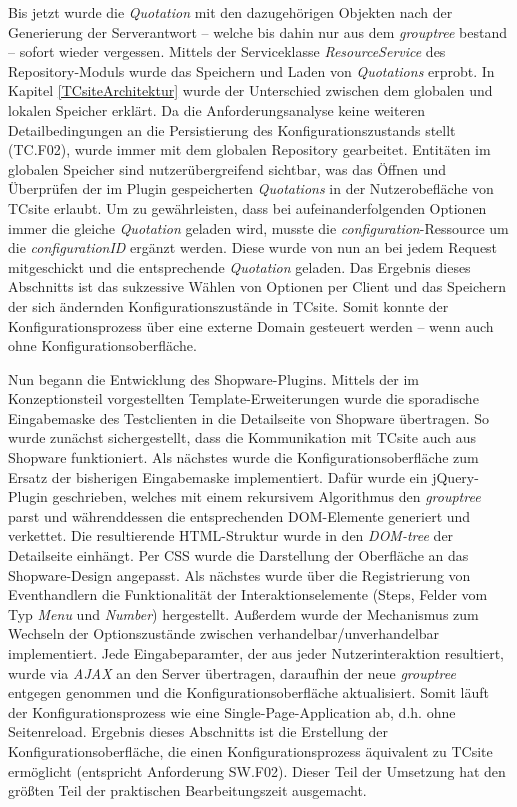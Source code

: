 \documentclass[11pt, a4paper, titlepage, listof=totoc, bibliography=totoc, index=totoc, twoside, openright, headings=normal, draft]{scrreprt}
\begin{document}
Bis jetzt wurde die \emph{Quotation} mit den dazugehörigen Objekten nach der Generierung der Serverantwort -- welche bis dahin nur aus dem \emph{grouptree} bestand -- sofort wieder vergessen. Mittels der Serviceklasse \emph{ResourceService} des Repository-Moduls wurde das Speichern und Laden von \emph{Quotations} erprobt. In Kapitel \ref{TCsiteArchitektur} wurde der Unterschied zwischen dem globalen und lokalen Speicher erklärt. Da die Anforderungsanalyse keine weiteren Detailbedingungen an die Persistierung des Konfigurationszustands stellt (TC.F02), wurde immer mit dem globalen Repository gearbeitet. Entitäten im globalen Speicher sind nutzerübergreifend sichtbar, was das Öffnen und Überprüfen der im Plugin gespeicherten \emph{Quotations} in der Nutzerobefläche von TCsite erlaubt. Um zu gewährleisten, dass bei aufeinanderfolgenden Optionen immer die gleiche \emph{Quotation} geladen wird, musste die \emph{configuration}-Ressource um die \emph{configurationID} ergänzt werden. Diese wurde von nun an bei jedem Request mitgeschickt und die entsprechende \emph{Quotation} geladen. Das Ergebnis dieses Abschnitts ist das sukzessive Wählen von Optionen per Client und das Speichern der sich ändernden Konfigurationszustände in TCsite. Somit konnte der Konfigurationsprozess über eine externe Domain gesteuert werden -- wenn auch ohne Konfigurationsoberfläche.

Nun begann die Entwicklung des Shopware-Plugins. Mittels der im Konzeptionsteil vorgestellten Template-Erweiterungen wurde die sporadische Eingabemaske des Testclienten in die Detailseite von Shopware übertragen. So wurde zunächst sichergestellt, dass die Kommunikation mit TCsite auch aus Shopware funktioniert. Als nächstes wurde die Konfigurationsoberfläche zum Ersatz der bisherigen Eingabemaske implementiert. Dafür wurde ein jQuery-Plugin geschrieben, welches mit einem rekursivem Algorithmus den \emph{grouptree} parst und währenddessen die entsprechenden DOM-Elemente generiert und verkettet. Die resultierende HTML-Struktur wurde in den \emph{DOM-tree} der Detailseite einhängt. Per CSS wurde die Darstellung der Oberfläche an das Shopware-Design angepasst. Als nächstes wurde über die Registrierung von Eventhandlern die Funktionalität der Interaktionselemente (Steps, Felder vom Typ \emph{Menu} und \emph{Number}) hergestellt. Außerdem wurde der Mechanismus zum Wechseln der Optionszustände zwischen verhandelbar/unverhandelbar implementiert. Jede Eingabeparamter, der aus jeder Nutzerinteraktion resultiert, wurde via \emph{AJAX} an den Server übertragen, daraufhin der neue \emph{grouptree} entgegen genommen und die Konfigurationsoberfläche aktualisiert. Somit läuft der Konfigurationsprozess wie eine Single-Page-Application ab, d.h. ohne Seitenreload. Ergebnis dieses Abschnitts ist die Erstellung der Konfigurationsoberfläche, die einen Konfigurationsprozess äquivalent zu TCsite ermöglicht (entspricht Anforderung SW.F02). Dieser Teil der Umsetzung hat den größten Teil der praktischen Bearbeitungszeit ausgemacht.
\end{document}
